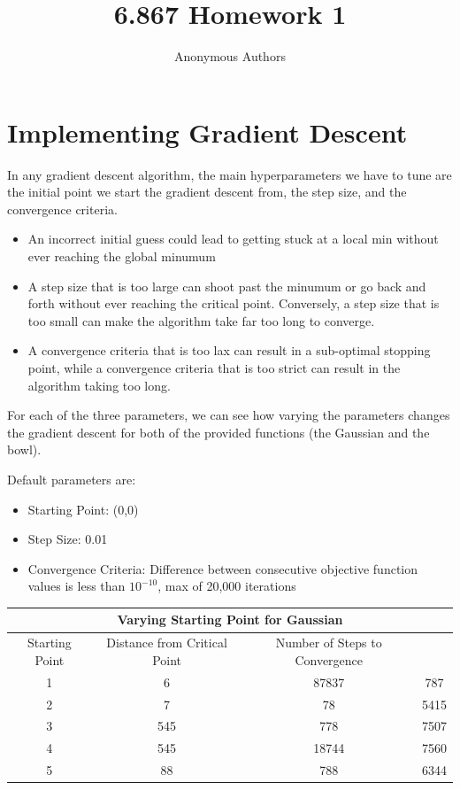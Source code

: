 \documentclass[journal]{IEEEtran}
\title{6.867 Homework 1}
\author{Anonymous Authors}
\begin{document}
\maketitle
\thispagestyle{fancy}

\section{Implementing Gradient Descent}

In any gradient descent algorithm, the main hyperparameters we have to tune are the initial point we start the gradient descent from, the step size, and the convergence criteria. 

\begin{itemize}

\item An incorrect initial guess could lead to getting stuck at a local min without ever reaching the global minumum
\item A step size that is too large can shoot past the minumum or go back and forth without ever reaching the critical point. Conversely, a step size that is too small can make the algorithm take far too long to converge.
\item A convergence criteria that is too lax can result in a sub-optimal stopping point, while a convergence criteria that is too strict can result in the algorithm taking too long.

\end{itemize}

For each of the three parameters, we can see how varying the parameters changes the gradient descent for both of the provided functions (the Gaussian and the bowl).

Default parameters are: 

\begin{itemize}

\item Starting Point: (0,0)
\item Step Size: 0.01
\item Convergence Criteria: Difference between consecutive objective function values is less than $10^{-10}$, max of 20,000 iterations

\end{itemize}

\begin{center}
 \begin{tabular}{||c c c c||} 
\hline
 \multicolumn{4}{|c|}{Varying Starting Point for Gaussian} \\
 \hline
 Starting Point & Distance from Critical Point  & Number of Steps to Convergence \\ [0.5ex] 
 \hline\hline
 1 & 6 & 87837 & 787 \\ 
 \hline
 2 & 7 & 78 & 5415 \\
 \hline
 3 & 545 & 778 & 7507 \\
 \hline
 4 & 545 & 18744 & 7560 \\
 \hline
 5 & 88 & 788 & 6344 \\ [1ex] 
 \hline
\end{tabular}
\end{center}
\end{document}
